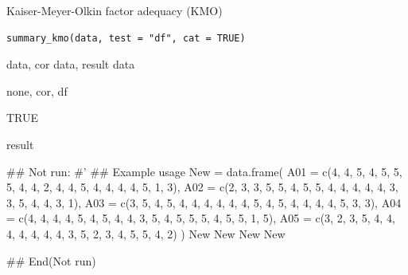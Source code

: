 \documentclass[a4paper]{book}
\begin{document}
%
\begin{Description}
Kaiser-Meyer-Olkin factor adequacy (KMO)
\end{Description}
%
\begin{Usage}
\begin{verbatim}
summary_kmo(data, test = "df", cat = TRUE)
\end{verbatim}
\end{Usage}
%
\begin{Arguments}
\begin{ldescription}
\item[\code{data}] data, cor data, result data

\item[\code{test}] none, cor, df

\item[\code{cat}] TRUE
\end{ldescription}
\end{Arguments}
%
\begin{Value}
result
\end{Value}
%
\begin{Examples}
\begin{ExampleCode}
\#\# Not run: 
#'
## Example usage
New = data.frame(
  A01 = c(4, 4, 5, 4, 5, 5, 5, 4, 4, 2, 4, 4, 5, 4, 4, 4, 4, 5, 1, 3),
  A02 = c(2, 3, 3, 5, 5, 4, 5, 5, 4, 4, 4, 4, 4, 3, 3, 5, 4, 4, 3, 1),
  A03 = c(3, 5, 4, 5, 4, 4, 4, 4, 4, 4, 5, 4, 5, 4, 4, 4, 4, 5, 3, 3),
  A04 = c(4, 4, 4, 4, 5, 4, 5, 4, 4, 3, 5, 4, 5, 5, 5, 4, 5, 5, 1, 5),
  A05 = c(3, 2, 3, 5, 4, 4, 4, 4, 4, 4, 4, 3, 5, 2, 3, 4, 5, 5, 4, 2)
)
New %
New %
New %
New %

## End(Not run)

\end{ExampleCode}
\end{Examples}
\end{document}

